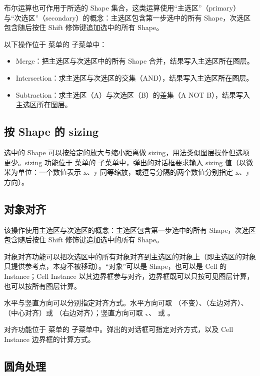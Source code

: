 布尔运算也可作用于所选的 Shape 集合，这类运算使用“主选区”（primary）与“次选区”（secondary）的概念：主选区包含第一步选中的所有 Shape，次选区包含随后按住 Shift 修饰键追加选中的所有 Shape。

以下操作位于  菜单的  子菜单中：

\begin{itemize}
\item Merge：把主选区与次选区中的所有 Shape 合并，结果写入主选区所在图层。
\item Intersection：求主选区与次选区的交集（AND），结果写入主选区所在图层。
\item Subtraction：求主选区（A）与次选区（B）的差集（A NOT B），结果写入主选区所在图层。
\end{itemize}

\subsection{按 Shape 的 sizing}\label{sec:shape_size}

选中的 Shape 可以按给定的放大与缩小距离做 sizing，用法类似图层操作但选项更少。sizing 功能位于  菜单的  子菜单中，弹出的对话框要求输入 sizing 值（以微米为单位：一个数值表示 x、y 同等缩放，或逗号分隔的两个数值分别指定 x、y 方向）。

\subsection{对象对齐}\label{sec:object_align}

该操作使用主选区与次选区的概念：主选区包含第一步选中的所有 Shape，次选区包含随后按住 Shift 修饰键追加选中的所有 Shape。

对象对齐功能可以把次选区中的所有对象对齐到主选区的对象上（即主选区的对象只提供参考点，本身不被移动）。“对象”可以是 Shape，也可以是 Cell 的 Instance；Cell Instance 以其边界框参与对齐，边界框既可以只按可见图层计算，也可以按所有图层计算。

水平与竖直方向可以分别指定对齐方式。水平方向可取 （不变）、（左边对齐）、（中心对齐）或 （右边对齐）；竖直方向可取 、、 或 。

对齐功能位于  菜单的  子菜单中。弹出的对话框可指定对齐方式，以及 Cell Instance 边界框的计算方式。

\subsection{圆角处理}\label{sec:round_corners}

